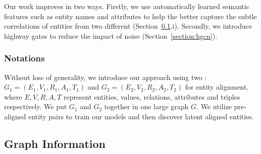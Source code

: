  Our work improves \RGCNs in two ways. Firstly, we use automatically learned semantic features such as entity names and attributes to
 help the \RGCN better capture the subtle correlations of entities from two different \KGs (Section~\ref{section:rgcn}.i).
    Secondly, we introduce highway gates to reduce the impact of noise (Section~\ref{section:hgcn}).




	


\subsubsection{Notations}

Without loss of generality, we introduce our approach using two \KGs: $G_1 = (E_1,V_1,R_1,A_1,T_1)$ and $G_2 = (E_2,V_2,R_2,A_2,T_2)$ for
entity alignment, where $E,V,R,A,T$ represent entities, values, relations, attributes and triples respectively. 	We put $G_1$ and $G_2$
together in one large graph $G$. We utilize pre-aligned entity pairs to train our models and then discover latent aligned entities.
	
	\subsection{Graph Information}
	\label{section:rgcn}	


